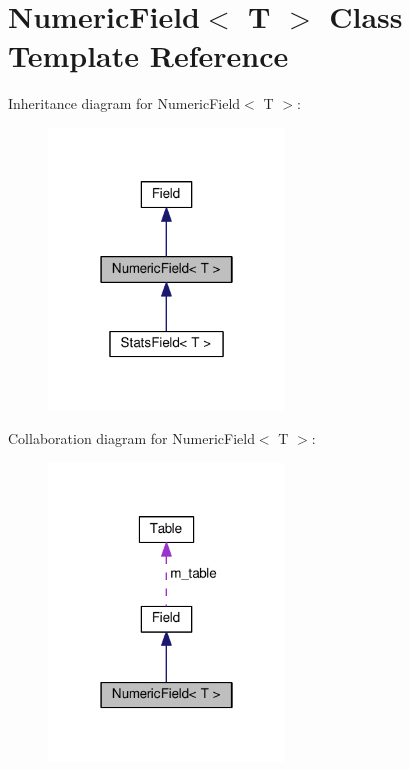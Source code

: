 \hypertarget{classNumericField}{}\section{Numeric\+Field$<$ T $>$ Class Template Reference}
\label{classNumericField}


Inheritance diagram for Numeric\+Field$<$ T $>$\+:
\nopagebreak
\begin{figure}[H]
\begin{center}
\leavevmode
\includegraphics[width=178pt]{classNumericField__inherit__graph}
\end{center}
\end{figure}


Collaboration diagram for Numeric\+Field$<$ T $>$\+:
\nopagebreak
\begin{figure}[H]
\begin{center}
\leavevmode
\includegraphics[width=178pt]{classNumericField__coll__graph}
\end{center}
\end{figure}
